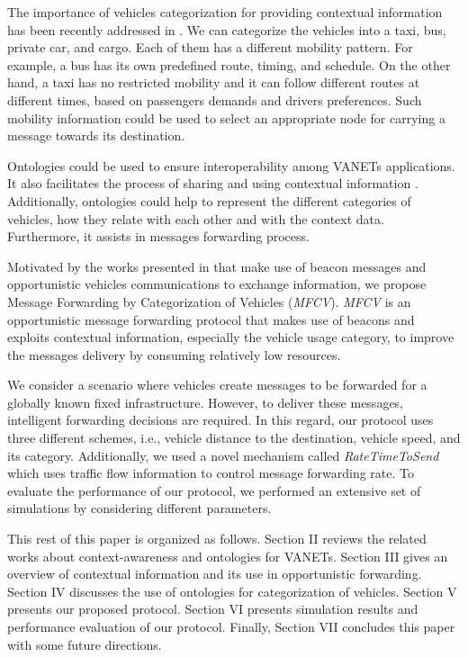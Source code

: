 \documentclass[letterpaper, 10 pt, conference]{ieeeconf}  %
\begin{document}
The importance of vehicles categorization for providing contextual information has been recently addressed in \cite{zhang2012, zhang2014}. We can categorize the vehicles into a taxi, bus, private car, and cargo. Each of them has a different mobility pattern. For example, a bus has its own predefined route, timing, and schedule. On the other hand, a taxi has no restricted mobility and it can follow different routes at different times, based on passengers demands and drivers preferences. Such mobility information could be used to select an appropriate node for carrying a message towards its destination.

Ontologies could be used to ensure interoperability among VANETs applications. It also facilitates the process of sharing and using contextual information \cite{madkour2011}. Additionally, ontologies could help to represent the different categories of vehicles, how they relate with each other and with the context data. Furthermore, it assists in messages forwarding process.

Motivated by the works presented in \cite{Yokoyama_2014, ullahadvertising} that make use of beacon messages and opportunistic vehicles communications to exchange information, we propose Message Forwarding by Categorization of Vehicles (\emph{MFCV}). \emph{MFCV} is an opportunistic message forwarding protocol that makes use of beacons and exploits contextual information, especially the vehicle usage category, to improve the messages delivery by consuming relatively low resources.

We consider a scenario where vehicles create messages to be forwarded for a globally known fixed infrastructure. However, to deliver these messages, intelligent forwarding decisions are required. In this regard, our protocol uses three different schemes, i.e., vehicle distance to the destination, vehicle speed, and its category. Additionally, we used a novel mechanism called \emph{RateTimeToSend} which uses traffic flow information to control message forwarding rate. To evaluate the performance of our protocol, we performed an extensive set of simulations by considering different parameters.

This rest of this paper is organized as follows. Section II reviews the related works about context-awareness and ontologies for VANETs. Section III gives an overview of contextual information and its use in opportunistic forwarding. Section IV discusses the use of ontologies for categorization of vehicles. Section V presents our proposed protocol. Section VI presents simulation results and performance evaluation of our protocol. Finally, Section VII concludes this paper with some future directions.
\end{document}

